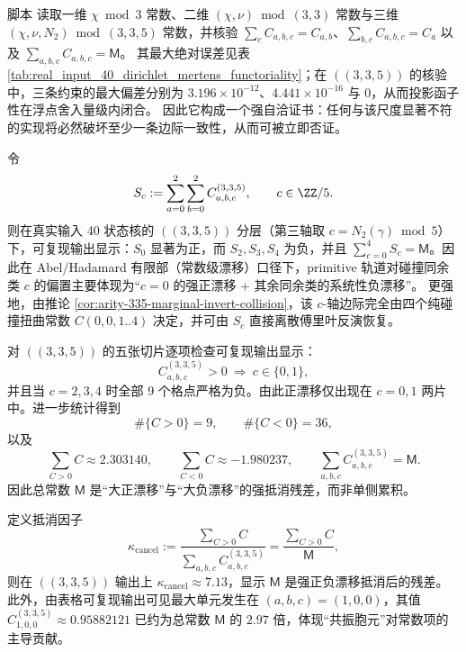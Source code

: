 \begin{remark}\label{rem:dirichlet-mertens-functoriality-check}
脚本  读取一维 \(\chi\bmod 3\) 常数、二维 \((\chi,\nu)\bmod(3,3)\) 常数与三维 \((\chi,\nu,N_2)\bmod(3,3,5)\) 常数，并核验
\(\sum_c C_{a,b,c}=C_{a,b}\)、\(\sum_{b,c}C_{a,b,c}=C_a\) 以及 \(\sum_{a,b,c}C_{a,b,c}=\mathsf{M}\)。
其最大绝对误差见表 \ref{tab:real_input_40_dirichlet_mertens_functoriality}；在 \(((3,3,5))\) 的核验中，三条约束的最大偏差分别为 \(3.196\times 10^{-12}\)、\(4.441\times 10^{-16}\) 与 \(0\)，从而投影函子性在浮点舍入量级内闭合。
因此它构成一个强自洽证书：任何与该尺度显著不符的实现将必然破坏至少一条边际一致性，从而可被立即否证。
\end{remark}



\begin{remark}\label{cor:arity-335-collision-residue-drift}
令
\[
S_c:=\sum_{a=0}^{2}\sum_{b=0}^{2}C^{(3,3,5)}_{a,b,c},
\qquad c\in\ZZ/5.
\]
则在真实输入 40 状态核的 \(((3,3,5))\) 分层（第三轴取 $c=N_2(\gamma)\bmod 5$）下，可复现输出显示：$S_0$ 显著为正，而 $S_2,S_3,S_4$ 为负，并且 $\sum_{c=0}^4 S_c=\mathsf{M}$。因此在 Abel/Hadamard 有限部（常数级漂移）口径下，primitive 轨道对碰撞同余类 $c$ 的偏置主要体现为“$c=0$ 的强正漂移 + 其余同余类的系统性负漂移”。
更强地，由推论 \ref{cor:arity-335-marginal-invert-collision}，该 \(c\)-轴边际完全由四个纯碰撞扭曲常数 \(C(0,0,1..4)\) 决定，并可由 \(S_c\) 直接离散傅里叶反演恢复。
\end{remark}

\begin{remark}[符号相变阈值与正漂移稀疏性]\label{cor:arity-335-sign-sparsity}
对 \(((3,3,5))\) 的五张切片逐项检查可复现输出显示：
\[
C^{(3,3,5)}_{a,b,c}>0\ \Longrightarrow\ c\in\{0,1\},
\]
并且当 $c=2,3,4$ 时全部 $9$ 个格点严格为负。由此正漂移仅出现在 $c=0,1$ 两片中。进一步统计得到
\[
\#\{C>0\}=9,\qquad \#\{C<0\}=36,
\]
以及
\[
\sum_{C>0}C\approx 2.303140,\qquad
\sum_{C<0}C\approx -1.980237,\qquad
\sum_{a,b,c}C^{(3,3,5)}_{a,b,c}=\mathsf{M}.
\]
因此总常数 $\mathsf{M}$ 是“大正漂移”与“大负漂移”的强抵消残差，而非单侧累积。
\end{remark}

\begin{remark}[抵消因子与共振胞元]\label{rem:arity-335-cancel-resonant}
定义抵消因子
\[
\kappa_{\mathrm{cancel}}:=\frac{\sum_{C>0}C}{\sum_{a,b,c}C^{(3,3,5)}_{a,b,c}}
=\frac{\sum_{C>0}C}{\mathsf{M}},
\]
则在 \(((3,3,5))\) 输出上
\(
\kappa_{\mathrm{cancel}}\approx 7.13
\)，显示 $\mathsf{M}$ 是强正负漂移抵消后的残差。
此外，由表格可复现输出可见最大单元发生在
\(
(a,b,c)=(1,0,0)
\)，其值
\(
C^{(3,3,5)}_{1,0,0}\approx 0.95882121
\)
已约为总常数 $\mathsf{M}$ 的 $2.97$ 倍，体现“共振胞元”对常数项的主导贡献。
\end{remark}
